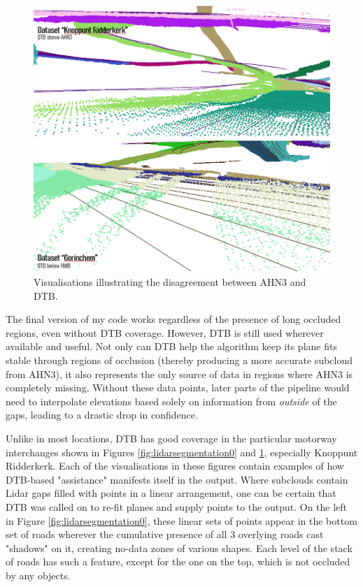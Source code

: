 \begin{figure}
    \centering
    \includegraphics[width=0.9\linewidth]{final_report/figs/lidarsegmentation1.png}
    \caption{Visualisations illustrating the disagreement between AHN3 and DTB.}
    \label{fig:lidarsegmentation1}
\end{figure}

The final version of my code works regardless of the presence of long occluded regions, even without DTB coverage. However, DTB is still used wherever available and useful. Not only can DTB help the algorithm keep its plane fits stable through regions of occlusion (thereby producing a more accurate subcloud from AHN3), it also represents the only source of data in regions where AHN3 is completely missing. Without these data points, later parts of the pipeline would need to interpolate elevations based solely on information from \textit{outside} of the gaps, leading to a drastic drop in confidence.

Unlike in most locations, DTB has good coverage in the particular motorway interchanges shown in Figures \ref{fig:lidarsegmentation0} and \ref{fig:lidarsegmentation1}, especially Knoppunt Ridderkerk. Each of the visualisations in these figures contain examples of how DTB-based "assistance" manifests itself in the output. Where subclouds contain Lidar gaps filled with points in a linear arrangement, one can be certain that DTB was called on to re-fit planes and supply points to the output. On the left in Figure \ref{fig:lidarsegmentation0}, these linear sets of points appear in the bottom set of roads wherever the cumulative presence of all 3 overlying roads cast "shadows" on it, creating no-data zones of various shapes. Each level of the stack of roads has such a feature, except for the one on the top, which is not occluded by any objects.

